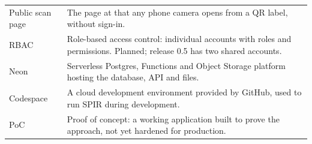 {\begin{xltabular}{\linewidth}{@{}L{3.6cm}Y@{}}
  Public scan page & The page at  that any phone camera opens from a QR label, without sign-in.\\
  RBAC & Role-based access control: individual accounts with roles and permissions. Planned; release 0.5 has two shared accounts.\\
  Neon & Serverless Postgres, Functions and Object Storage platform hosting the database, API and files.\\
  Codespace & A cloud development environment provided by GitHub, used to run SPIR during development.\\
  PoC & Proof of concept: a working application built to prove the approach, not yet hardened for production.\\
\end{xltabular}}
